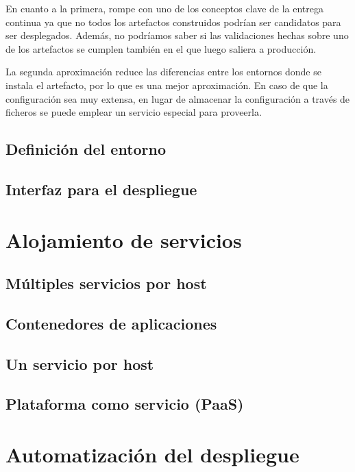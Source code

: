 \documentclass[11pt,a4paper]{article}
\begin{document}
En cuanto a la primera, rompe con uno de los conceptos clave de la entrega continua ya que no todos los artefactos construidos podrían ser candidatos para ser desplegados. Además, no podríamos saber si las validaciones hechas sobre uno de los artefactos se cumplen también en el que luego saliera a producción.

La segunda aproximación reduce las diferencias entre los entornos donde se instala el artefacto, por lo que es una mejor aproximación. En caso de que la configuración sea muy extensa, en lugar de almacenar la configuración a través de ficheros se puede emplear un servicio especial para proveerla.

\subsection{Definición del entorno}

\subsection{Interfaz para el despliegue}

\section{Alojamiento de servicios}

\subsection{Múltiples servicios por host}

\subsection{Contenedores de aplicaciones}

\subsection{Un servicio por host}

\subsection{Plataforma como servicio (PaaS)}

\section{Automatización del despliegue}
\end{document}
